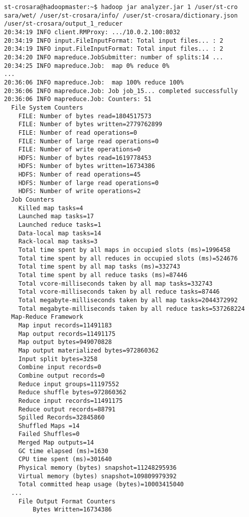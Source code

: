 \documentclass{article}
\begin{document}
\begin{verbatim}
st-crosara@hadoopmaster:~$ hadoop jar analyzer.jar 1 /user/st-cro
sara/wet/ /user/st-crosara/info/ /user/st-crosara/dictionary.json
/user/st-crosara/output_1_reducer
20:34:19 INFO client.RMProxy: .../10.0.2.100:8032
20:34:19 INFO input.FileInputFormat: Total input files... : 2
20:34:19 INFO input.FileInputFormat: Total input files... : 2
20:34:20 INFO mapreduce.JobSubmitter: number of splits:14 ...
20:34:25 INFO mapreduce.Job:  map 0% reduce 0%
...
20:36:06 INFO mapreduce.Job:  map 100% reduce 100%
20:36:06 INFO mapreduce.Job: Job job_15... completed successfully
20:36:06 INFO mapreduce.Job: Counters: 51
  File System Counters
	FILE: Number of bytes read=1804517573
	FILE: Number of bytes written=2779762899
	FILE: Number of read operations=0
	FILE: Number of large read operations=0
	FILE: Number of write operations=0
	HDFS: Number of bytes read=1619778453
	HDFS: Number of bytes written=16734386
	HDFS: Number of read operations=45
	HDFS: Number of large read operations=0
	HDFS: Number of write operations=2
  Job Counters 
	Killed map tasks=4
	Launched map tasks=17
	Launched reduce tasks=1
	Data-local map tasks=14
	Rack-local map tasks=3
	Total time spent by all maps in occupied slots (ms)=1996458
	Total time spent by all reduces in occupied slots (ms)=524676
	Total time spent by all map tasks (ms)=332743
	Total time spent by all reduce tasks (ms)=87446
	Total vcore-milliseconds taken by all map tasks=332743
	Total vcore-milliseconds taken by all reduce tasks=87446
	Total megabyte-milliseconds taken by all map tasks=2044372992
	Total megabyte-milliseconds taken by all reduce tasks=537268224
  Map-Reduce Framework
	Map input records=11491183
	Map output records=11491175
	Map output bytes=949070828
	Map output materialized bytes=972860362
	Input split bytes=3258
	Combine input records=0
	Combine output records=0
	Reduce input groups=11197552
	Reduce shuffle bytes=972860362
	Reduce input records=11491175
	Reduce output records=88791
	Spilled Records=32845860
	Shuffled Maps =14
	Failed Shuffles=0
	Merged Map outputs=14
	GC time elapsed (ms)=1630
	CPU time spent (ms)=301640
	Physical memory (bytes) snapshot=11248295936
	Virtual memory (bytes) snapshot=109809979392
	Total committed heap usage (bytes)=10003415040
  ...
	File Output Format Counters 
		Bytes Written=16734386
\end{verbatim}
\end{document}
